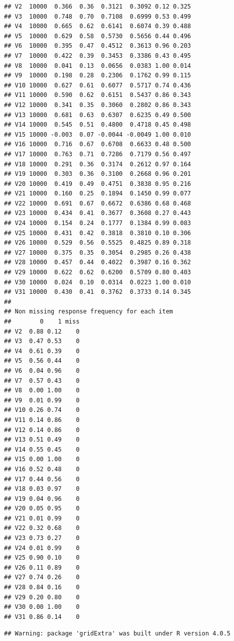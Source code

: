 \documentclass[
  english,
  man,floatsintext]{apa6}
\begin{document}
\begin{verbatim}
## V2  10000  0.366  0.36  0.3121  0.3092 0.12 0.325
## V3  10000  0.748  0.70  0.7108  0.6999 0.53 0.499
## V4  10000  0.665  0.62  0.6141  0.6074 0.39 0.488
## V5  10000  0.629  0.58  0.5730  0.5656 0.44 0.496
## V6  10000  0.395  0.47  0.4512  0.3613 0.96 0.203
## V7  10000  0.422  0.39  0.3453  0.3386 0.43 0.495
## V8  10000  0.041  0.13  0.0656  0.0383 1.00 0.014
## V9  10000  0.198  0.28  0.2306  0.1762 0.99 0.115
## V10 10000  0.627  0.61  0.6077  0.5717 0.74 0.436
## V11 10000  0.590  0.62  0.6151  0.5437 0.86 0.343
## V12 10000  0.341  0.35  0.3060  0.2802 0.86 0.343
## V13 10000  0.681  0.63  0.6307  0.6235 0.49 0.500
## V14 10000  0.545  0.51  0.4800  0.4718 0.45 0.498
## V15 10000 -0.003  0.07 -0.0044 -0.0049 1.00 0.010
## V16 10000  0.716  0.67  0.6708  0.6633 0.48 0.500
## V17 10000  0.763  0.71  0.7286  0.7179 0.56 0.497
## V18 10000  0.291  0.36  0.3174  0.2612 0.97 0.164
## V19 10000  0.303  0.36  0.3100  0.2668 0.96 0.201
## V20 10000  0.419  0.49  0.4751  0.3838 0.95 0.216
## V21 10000  0.160  0.25  0.1894  0.1450 0.99 0.077
## V22 10000  0.691  0.67  0.6672  0.6386 0.68 0.468
## V23 10000  0.434  0.41  0.3677  0.3608 0.27 0.443
## V24 10000  0.154  0.24  0.1777  0.1384 0.99 0.083
## V25 10000  0.431  0.42  0.3818  0.3810 0.10 0.306
## V26 10000  0.529  0.56  0.5525  0.4825 0.89 0.318
## V27 10000  0.375  0.35  0.3054  0.2985 0.26 0.438
## V28 10000  0.457  0.44  0.4022  0.3987 0.16 0.362
## V29 10000  0.622  0.62  0.6200  0.5709 0.80 0.403
## V30 10000  0.024  0.10  0.0314  0.0223 1.00 0.010
## V31 10000  0.430  0.41  0.3762  0.3733 0.14 0.345
## 
## Non missing response frequency for each item
##        0    1 miss
## V2  0.88 0.12    0
## V3  0.47 0.53    0
## V4  0.61 0.39    0
## V5  0.56 0.44    0
## V6  0.04 0.96    0
## V7  0.57 0.43    0
## V8  0.00 1.00    0
## V9  0.01 0.99    0
## V10 0.26 0.74    0
## V11 0.14 0.86    0
## V12 0.14 0.86    0
## V13 0.51 0.49    0
## V14 0.55 0.45    0
## V15 0.00 1.00    0
## V16 0.52 0.48    0
## V17 0.44 0.56    0
## V18 0.03 0.97    0
## V19 0.04 0.96    0
## V20 0.05 0.95    0
## V21 0.01 0.99    0
## V22 0.32 0.68    0
## V23 0.73 0.27    0
## V24 0.01 0.99    0
## V25 0.90 0.10    0
## V26 0.11 0.89    0
## V27 0.74 0.26    0
## V28 0.84 0.16    0
## V29 0.20 0.80    0
## V30 0.00 1.00    0
## V31 0.86 0.14    0
\end{verbatim}

\begin{verbatim}
## Warning: package 'gridExtra' was built under R version 4.0.5
\end{verbatim}
\end{document}
